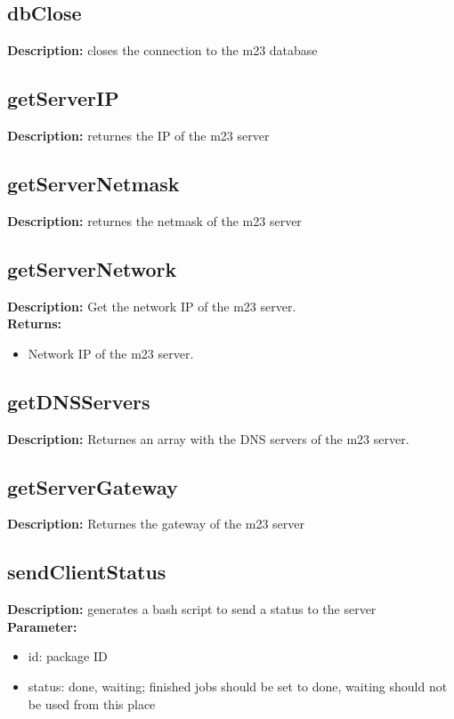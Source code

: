 \subsection{dbClose}
\textbf{Description:} closes the connection to the m23 database\\

\subsection{getServerIP}
\textbf{Description:} returnes the IP of the m23 server\\

\subsection{getServerNetmask}
\textbf{Description:} returnes the netmask of the m23 server\\

\subsection{getServerNetwork}
\textbf{Description:} Get the network IP of the m23 server.\\
\textbf{Returns:}
\begin{itemize}
\item Network IP of the m23 server.
\end{itemize}

\subsection{getDNSServers}
\textbf{Description:} Returnes an array with the DNS servers of the m23 server.\\

\subsection{getServerGateway}
\textbf{Description:} Returnes the gateway of the m23 server\\

\subsection{sendClientStatus}
\textbf{Description:} generates a bash script to send a status to the server\\
\textbf{Parameter:}
\begin{itemize}
\item id: package ID
\item status: done, waiting; finished jobs should be set to done, waiting should not be used from this place
\end{itemize}

